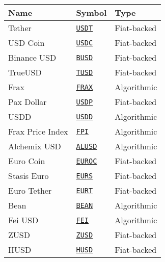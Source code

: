\begin{tabular}{lll}
\toprule
Name & Symbol & Type \\
\midrule
Tether & \href{https://etherscan.io/address/0xdAC17F958D2ee523a2206206994597C13D831ec7}{\tt USDT} & Fiat-backed \\
USD Coin & \href{https://etherscan.io/address/0xA0b86991c6218b36c1d19D4a2e9Eb0cE3606eB48}{\tt USDC} & Fiat-backed \\
Binance USD & \href{https://etherscan.io/address/0x4Fabb145d64652a948d72533023f6E7A623C7C53}{\tt BUSD} & Fiat-backed \\
TrueUSD & \href{https://etherscan.io/address/0x0000000000085d4780B73119b644AE5ecd22b376}{\tt TUSD} & Fiat-backed \\
Frax & \href{https://etherscan.io/address/0x853d955aCEf822Db058eb8505911ED77F175b99e}{\tt FRAX} & Algorithmic \\
Pax Dollar & \href{https://etherscan.io/address/0x8E870D67F660D95d5be530380D0eC0bd388289E1}{\tt USDP} & Fiat-backed \\
USDD & \href{https://etherscan.io/address/0x0C10bF8FcB7Bf5412187A595ab97a3609160b5c6}{\tt USDD} & Algorithmic \\
Frax Price Index & \href{https://etherscan.io/address/0x5Ca135cB8527d76e932f34B5145575F9d8cbE08E}{\tt FPI} & Algorithmic \\
Alchemix USD & \href{https://etherscan.io/address/0xBC6DA0FE9aD5f3b0d58160288917AA56653660E9}{\tt ALUSD} & Algorithmic \\
Euro Coin & \href{https://etherscan.io/address/0x1aBaEA1f7C830bD89Acc67eC4af516284b1bC33c}{\tt EUROC} & Fiat-backed \\
Stasis Euro & \href{https://etherscan.io/address/0xdB25f211AB05b1c97D595516F45794528a807ad8}{\tt EURS} & Fiat-backed \\
Euro Tether & \href{https://etherscan.io/address/0xC581b735A1688071A1746c968e0798D642EDE491}{\tt EURT} & Fiat-backed \\
Bean & \href{https://etherscan.io/address/0xBEA0000029AD1c77D3d5D23Ba2D8893dB9d1Efab}{\tt BEAN} & Algorithmic \\
Fei USD & \href{https://etherscan.io/address/0x956F47F50A910163D8BF957Cf5846D573E7f87CA}{\tt FEI} & Algorithmic \\
ZUSD & \href{https://etherscan.io/address/0xc56c2b7e71B54d38Aab6d52E94a04Cbfa8F604fA}{\tt ZUSD} & Fiat-backed \\
HUSD & \href{https://etherscan.io/address/0xdF574c24545E5FfEcb9a659c229253D4111d87e1}{\tt HUSD} & Fiat-backed \\

\end{tabular}
